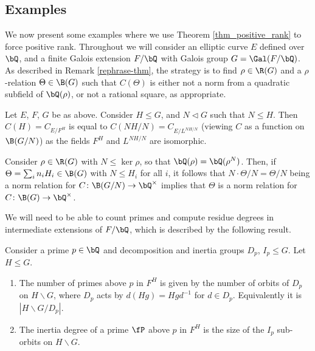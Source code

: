 \subsection{Examples}

We now present some examples where we use Theorem \ref{thm_positive_rank} to force positive rank. Throughout we will consider an elliptic curve $E$ defined over $\bQ$, and a finite Galois extension $F / \bQ$ with Galois group $G = \Gal(F / \bQ)$. As described in Remark \ref{rephrase-thm}, the strategy is to find $\rho \in \R(G)$ and a $\rho$-relation $\Theta \in \B(G)$ such that $C(\Theta)$ is either not a norm from a quadratic subfield of $\bQ(\rho)$, or not a rational square, as appropriate. 

\begin{rem}
    Let $E$, $F$, $G$ be as above. Consider $H \leq G$, and $N \triangleleft G$ such that $N \leq H$. Then $C(H) = C_{E / F^H}$ is equal to $C(NH/N) = C_{E / L^{NH/N}}$ (viewing $C$ as a function on $\B(G / N)$) as the fields $F^H$ and $L^{NH/ N}$ are isomorphic. 
    
    Consider $\rho \in \R(G)$ with $N \leq \ker \rho$, so that $\bQ(\rho) = \bQ(\rho^N)$. Then, if $\Theta = \sum_i n_i H_i \in \B(G)$ with $N \leq H_i$ for all $i$, it follows that $N \cdot \Theta / N = \Theta / N$ being a norm relation for $C \colon \B(G / N) \to \bQ^{\times}$ implies that $\Theta$ is a norm relation for $C \colon \B(G) \to \bQ^{\times}$. 
\end{rem}

We will need to be able to count primes and compute residue degrees in intermediate extensions of $F / \bQ$, which is described by the following result. 

\begin{prop}
Consider a prime $p \in \bQ$ and decomposition and inertia groups $D_p$, $I_p \leq G$. Let $H \leq G$. 
\begin{enumerate}
    \setlength\itemsep{0em}
    \item The number of primes above $p$ in $F^H$ is given by the number of orbits of $D_p$ on $H \backslash G$, where $D_p$ acts by $d(Hg) = H g d^{-1}$ for $d \in D_p$. Equivalently it is $|H \backslash G / D_p|$.
    \item The inertia degree of a prime $\fP$ above $p$ in $F^H$ is the size of the $I_p$ sub-orbits on $H \backslash G$. 
\end{enumerate}
\end{prop}

